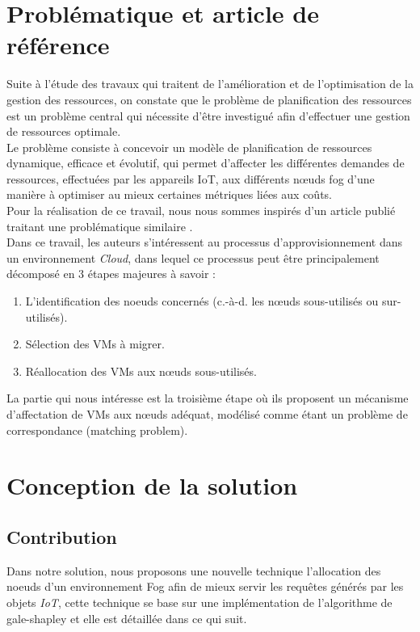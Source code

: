 \section{Problématique et article de référence}
Suite à l'étude des travaux qui traitent de l'amélioration et de l'optimisation de la gestion des ressources, on constate que le problème de planification des ressources est un problème central qui nécessite d'être investigué afin d'effectuer une gestion de ressources optimale. \\
Le problème consiste à concevoir un modèle de planification de ressources dynamique, efficace et évolutif, qui permet d'affecter les différentes demandes de ressources, effectuées par les appareils IoT, aux différents nœuds fog d'une manière à optimiser au mieux certaines métriques liées aux coûts.\\
Pour la réalisation de ce travail, nous nous sommes inspirés d'un article publié traitant une problématique similaire \cite{jing2016}. \\
Dans ce travail, les auteurs s'intéressent au processus d'approvisionnement dans un environnement \emph{Cloud}, dans lequel ce processus peut être principalement décomposé en 3 étapes majeures à savoir : 
\begin{enumerate}
    \item L'identification des noeuds concernés (c.-à-d. les nœuds sous-utilisés ou sur-utilisés). 
    \item Sélection des VMs à migrer.
    \item Réallocation des VMs aux nœuds sous-utilisés.
\end{enumerate}
La partie qui nous intéresse est la troisième étape où ils proposent un mécanisme d'affectation de VMs aux nœuds adéquat, modélisé comme étant un problème de correspondance (matching problem).

\section{Conception de la solution}
\subsection{Contribution}
Dans notre solution, nous proposons une nouvelle technique l'allocation des noeuds d'un environnement Fog afin de mieux servir les requêtes générés par les objets \emph{IoT}, cette technique se base sur une implémentation de l'algorithme de gale-shapley \cite{gale-shapley} et elle est détaillée dans ce qui suit.

